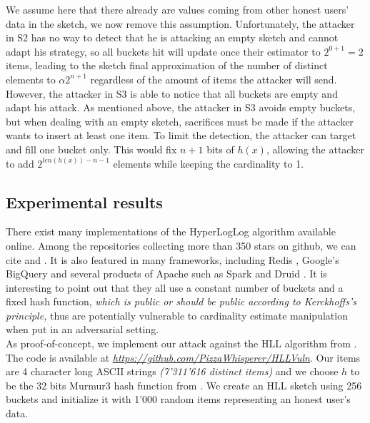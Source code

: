 \documentclass{IEEEtran}
\begin{document}
We assume here that there already are values coming from other honest users' data in the sketch, we now remove this assumption. Unfortunately, the attacker in S2 has no way to detect that he is attacking an empty sketch and cannot adapt his strategy, so all buckets hit will update once their estimator to $2^{0+1}=2$ items, leading to the sketch final approximation of the number of distinct elements to $\alpha2^{n+1}$ regardless of the amount of items the attacker will send. However, the attacker in S3 is able to notice that all buckets are empty and adapt his attack. As mentioned above, the attacker in S3 avoids empty buckets, but when dealing with an empty sketch, sacrifices must be made if the attacker wants to insert at least one item. To limit the detection, the attacker can target and fill one bucket only. This would fix $n+1$ bits of $h(x)$, allowing the attacker to add $2^{len(h(x))-n-1}$ elements while keeping the cardinality to 1.

\subsection{Experimental results}
There exist many implementations of the HyperLogLog algorithm available online. Among the repositories collecting more than 350 stars on github, we can cite \cite{clahll} and \cite{datasketch}. It is also featured in many frameworks, including Redis \cite{redis}, Google's BigQuery \cite{bigquery} and several products of Apache such as Spark \cite{spahll} \cite{spahll2} and Druid \cite{druhll}. It is interesting to point out that they all use a constant number of buckets and a fixed hash function, \textit{which is public or should be public according to Kerckhoffs's principle,} thus are potentially vulnerable to cardinality estimate manipulation when put in an adversarial setting.\\

As proof-of-concept, we implement our attack against the HLL algorithm from \cite{clahll}. The code is available at \href{https://github.com/PizzaWhisperer/HLLVuln}{\textit{\url{https://github.com/PizzaWhisperer/HLLVuln}}}. Our items are 4 character long ASCII strings \textit{(7'311'616 distinct items)} and we choose $h$ to be the 32 bits Murmur3 hash function from \cite{murmur3code}. We create an HLL sketch using 256 buckets and initialize it with 1'000 random items representing an honest user's data.
\end{document}
